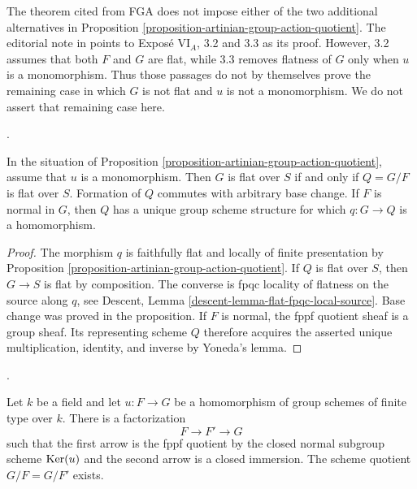 \begin{remark}
\label{remark-artinian-group-action-quotient-residual}
The theorem cited from FGA does not impose either of the two additional
alternatives in Proposition
\ref{proposition-artinian-group-action-quotient}. The editorial note in
\cite[Expos\'e V, note 1]{SGA3} points to Expos\'e VI$_A$, 3.2 and 3.3
as its proof. However, 3.2 assumes that both $F$ and $G$ are flat, while
3.3 removes flatness of $G$ only when $u$ is a monomorphism. Thus those
passages do not by themselves prove the remaining case in which $G$ is
not flat and $u$ is not a monomorphism. We do not assert that remaining
case here.
\end{remark}

\begin{lemma}
\label{lemma-artinian-flat-subgroup-quotient}
\begin{reference}
\cite[Expos\'e 212, Corollaire 7.3, p. 115]{FGA}.
\end{reference}
In the situation of Proposition
\ref{proposition-artinian-group-action-quotient}, assume that $u$ is a
monomorphism. Then $G$ is flat over $S$ if and only if $Q = G/F$ is flat
over $S$. Formation of $Q$ commutes with arbitrary base change. If $F$
is normal in $G$, then $Q$ has a unique group scheme structure for which
$q : G \to Q$ is a homomorphism.
\end{lemma}

\begin{proof}
The morphism $q$ is faithfully flat and locally of finite presentation
by Proposition \ref{proposition-artinian-group-action-quotient}. If $Q$
is flat over $S$, then $G \to S$ is flat by composition. The converse is
fpqc locality of flatness on the source along $q$, see Descent, Lemma
\ref{descent-lemma-flat-fpqc-local-source}. Base change was proved in
the proposition. If $F$ is normal, the fppf quotient sheaf is a group
sheaf. Its representing scheme $Q$ therefore acquires the asserted
unique multiplication, identity, and inverse by Yoneda's lemma.
\end{proof}

\begin{lemma}
\label{lemma-homomorphism-algebraic-groups-factorization}
\begin{reference}
\cite[Expos\'e 212, Corollaire 7.4, pp. 115--116]{FGA}.
\end{reference}
Let $k$ be a field and let $u : F \to G$ be a homomorphism of group
schemes of finite type over $k$. There is a factorization
$$
F \longrightarrow F' \longrightarrow G
$$
such that the first arrow is the fppf quotient by the closed normal
subgroup scheme $\mathop{\mathrm{Ker}}(u)$ and the second arrow is a closed immersion.
The scheme quotient $G/F = G/F'$ exists.
\end{lemma}

